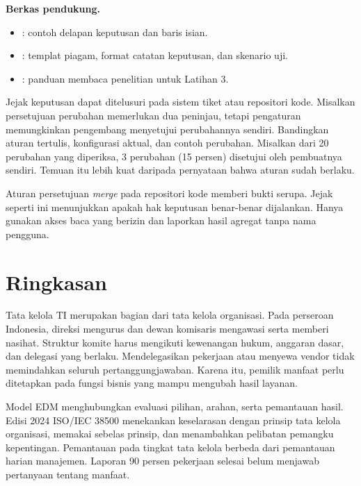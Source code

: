 \textbf{Berkas pendukung.}
\begin{itemize}
  \item {}: contoh delapan keputusan dan baris
  isian.
  \item {}: templat piagam, format catatan
  keputusan, dan skenario uji.
  \item {}: panduan membaca penelitian untuk
  Latihan 3.
\end{itemize}

\begin{pendalaman}
Jejak keputusan dapat ditelusuri pada sistem tiket atau repositori kode. Misalkan persetujuan
perubahan memerlukan dua peninjau, tetapi pengaturan memungkinkan pengembang menyetujui
perubahannya sendiri. Bandingkan aturan tertulis, konfigurasi aktual, dan contoh perubahan. Misalkan
dari 20 perubahan yang diperiksa, 3 perubahan (15 persen) disetujui oleh pembuatnya sendiri. Temuan
itu lebih kuat daripada pernyataan bahwa aturan sudah berlaku.

Aturan persetujuan \textit{merge} pada repositori kode memberi bukti serupa. Jejak seperti ini
menunjukkan apakah hak keputusan benar-benar dijalankan. Hanya gunakan akses baca yang berizin dan
laporkan hasil agregat tanpa nama pengguna.
\end{pendalaman}

\section{Ringkasan}

Tata kelola TI merupakan bagian dari tata kelola organisasi. Pada perseroan Indonesia, direksi
mengurus dan dewan komisaris mengawasi serta memberi nasihat. Struktur komite harus mengikuti
kewenangan hukum, anggaran dasar, dan delegasi yang berlaku. Mendelegasikan pekerjaan atau menyewa
vendor tidak memindahkan seluruh pertanggungjawaban. Karena itu, pemilik manfaat perlu ditetapkan
pada fungsi bisnis yang mampu mengubah hasil layanan.

Model EDM menghubungkan evaluasi pilihan, arahan, serta pemantauan hasil. Edisi 2024 ISO/IEC 38500
menekankan keselarasan dengan prinsip tata kelola organisasi, memakai sebelas prinsip, dan menambahkan
pelibatan pemangku kepentingan. Pemantauan pada tingkat tata kelola berbeda dari pemantauan harian
manajemen. Laporan 90 persen pekerjaan selesai belum menjawab pertanyaan tentang manfaat.

